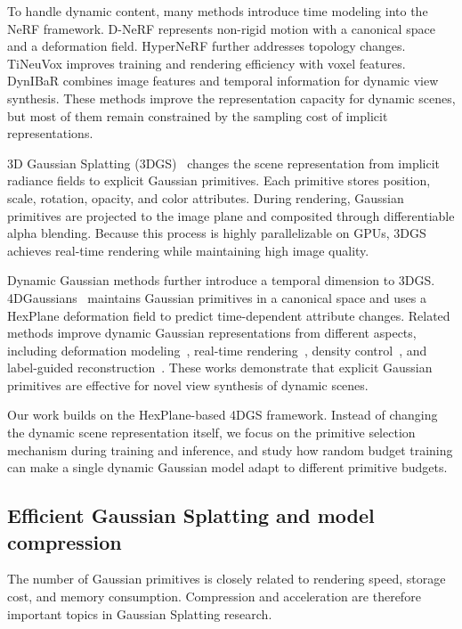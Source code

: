 \documentclass[pdflatex,sn-mathphys]{sn-jnl}
\begin{document}
To handle dynamic content, many methods introduce time modeling into the NeRF framework. D-NeRF represents non-rigid motion with a canonical space and a deformation field. HyperNeRF further addresses topology changes. TiNeuVox improves training and rendering efficiency with voxel features. DynIBaR combines image features and temporal information for dynamic view synthesis. These methods improve the representation capacity for dynamic scenes, but most of them remain constrained by the sampling cost of implicit representations.

3D Gaussian Splatting (3DGS)~\cite{kerbl20233dgaussians} changes the scene representation from implicit radiance fields to explicit Gaussian primitives. Each primitive stores position, scale, rotation, opacity, and color attributes. During rendering, Gaussian primitives are projected to the image plane and composited through differentiable alpha blending. Because this process is highly parallelizable on GPUs, 3DGS achieves real-time rendering while maintaining high image quality.

Dynamic Gaussian methods further introduce a temporal dimension to 3DGS. 4DGaussians~\cite{wu20244dgaussians} maintains Gaussian primitives in a canonical space and uses a HexPlane deformation field to predict time-dependent attribute changes. Related methods improve dynamic Gaussian representations from different aspects, including deformation modeling~\cite{yang2024deformable3dgs,duan20244drotor}, real-time rendering~\cite{yang2024realtime4dgs}, density control~\cite{cao2026spatiogs}, and label-guided reconstruction~\cite{wang2026label4dgs}. These works demonstrate that explicit Gaussian primitives are effective for novel view synthesis of dynamic scenes.

Our work builds on the HexPlane-based 4DGS framework. Instead of changing the dynamic scene representation itself, we focus on the primitive selection mechanism during training and inference, and study how random budget training can make a single dynamic Gaussian model adapt to different primitive budgets.

\subsection{Efficient Gaussian Splatting and model compression}

The number of Gaussian primitives is closely related to rendering speed, storage cost, and memory consumption. Compression and acceleration are therefore important topics in Gaussian Splatting research.
\end{document}
